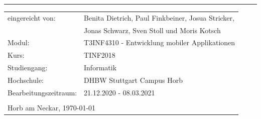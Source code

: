 \begin{flushleft}
    {\Large{}\rule[0.5ex]{1\columnwidth}{1pt}}{\Large\par}
    \par
\end{flushleft}

\begin{tabular}{ll}
    eingereicht von:\hspace{1cm} & Benita Dietrich, Paul Finkbeiner, Josua Stricker,
    \tabularnewline
    & Jonas Schwarz, Sven Stoll und Moris Kotsch
    \tabularnewline
    Modul: & T3INF4310 - Entwicklung mobiler Applikationen
    \tabularnewline
    Kurs: & TINF2018
    \tabularnewline
    Studiengang: & Informatik
    \tabularnewline
    Hochschule: & DHBW Stuttgart Campus Horb
    \tabularnewline
    Bearbeitungszeitraum: & 21.12.2020 - 08.03.2021
    \tabularnewline
    \tabularnewline
    \multicolumn{2}{l}{Horb am Neckar, \today}
    \tabularnewline
\end{tabular}

\begin{flushleft}
    \newpage{}
    \par
\end{flushleft}